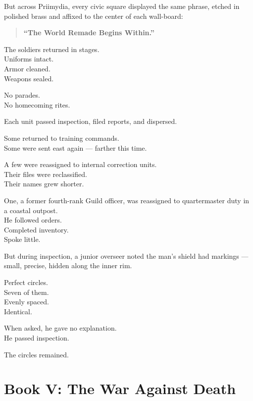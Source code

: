 \documentclass[12pt]{article}
\begin{document}
But across Priimydia, every civic square displayed the same phrase, etched in polished brass and affixed to the center of each wall-board:

\begin{quote}
\textbf{“The World Remade Begins Within.”}
\end{quote}

\vspace{1em}

The soldiers returned in stages.\\
Uniforms intact.\\
Armor cleaned.\\
Weapons sealed.

No parades.\\
No homecoming rites.

Each unit passed inspection, filed reports, and dispersed.

\vspace{1em}

Some returned to training commands.\\
Some were sent east again — farther this time.

A few were reassigned to internal correction units.\\
Their files were reclassified.\\
Their names grew shorter.

\vspace{1em}

One, a former fourth-rank Guild officer, was reassigned to quartermaster duty in a coastal outpost.\\
He followed orders.\\
Completed inventory.\\
Spoke little.

But during inspection, a junior overseer noted the man’s shield had markings — small, precise, hidden along the inner rim.

Perfect circles.\\
Seven of them.\\
Evenly spaced.\\
Identical.

When asked, he gave no explanation.\\
He passed inspection.

The circles remained.

\newpage

\section*{Book V: The War Against Death}
\end{document}
